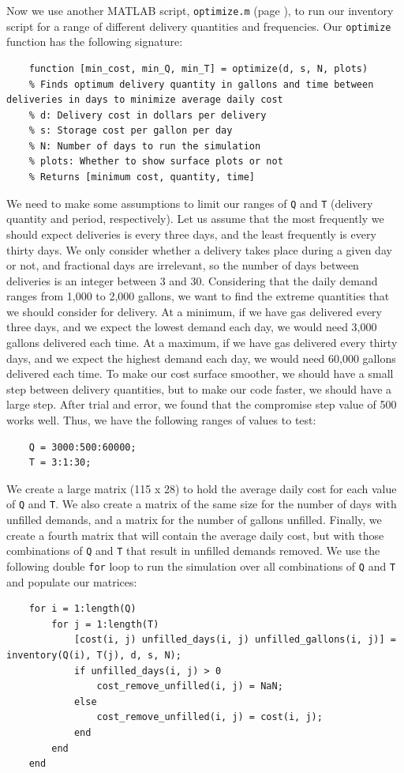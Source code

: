 \documentclass{article}
\begin{document}
    Now we use another MATLAB script, \texttt{optimize.m} (page \pageref{code:optimize}), to run our inventory script for a range of different delivery quantities and frequencies. Our \texttt{optimize} function has the following signature:
    \begin{verbatim}
    function [min_cost, min_Q, min_T] = optimize(d, s, N, plots)
    % Finds optimum delivery quantity in gallons and time between deliveries in days to minimize average daily cost
    % d: Delivery cost in dollars per delivery
    % s: Storage cost per gallon per day
    % N: Number of days to run the simulation
    % plots: Whether to show surface plots or not
    % Returns [minimum cost, quantity, time]
    \end{verbatim}
    We need to make some assumptions to limit our ranges of \texttt{Q} and \texttt{T} (delivery quantity and period, respectively). Let us assume that the most frequently we should expect deliveries is every three days, and the least frequently is every thirty days. We only consider whether a delivery takes place during a given day or not, and fractional days are irrelevant, so the number of days between deliveries is an integer between 3 and 30. Considering that the daily demand ranges from 1,000 to 2,000 gallons, we want to find the extreme quantities that we should consider  for delivery. At a minimum, if we have gas delivered every three days, and we expect the lowest demand each day, we would need 3,000 gallons delivered each time. At a maximum, if we have gas delivered every thirty days, and we expect the highest demand each day, we would need 60,000 gallons delivered each time. To make our cost surface smoother, we should have a small step between delivery quantities, but to make our code faster, we should have a large step. After trial and error, we found that the compromise step value of 500 works well. Thus, we have the following ranges of values to test:
    \begin{verbatim}
    Q = 3000:500:60000;
    T = 3:1:30;
    \end{verbatim}

    \pagebreak
    We create a large matrix (115 x 28) to hold the average daily cost for each value of \texttt{Q} and \texttt{T}. We also create a matrix of the same size for the number of days with unfilled demands, and a matrix for the number of gallons unfilled. Finally, we create a fourth matrix that will contain the average daily cost, but with those combinations of \texttt{Q} and \texttt{T} that result in unfilled demands removed. We use the following double \texttt{for} loop to run the simulation over all combinations of \texttt{Q} and \texttt{T} and populate our matrices:
    \begin{verbatim}
    for i = 1:length(Q)
        for j = 1:length(T)
            [cost(i, j) unfilled_days(i, j) unfilled_gallons(i, j)] = inventory(Q(i), T(j), d, s, N);
            if unfilled_days(i, j) > 0
                cost_remove_unfilled(i, j) = NaN;
            else
                cost_remove_unfilled(i, j) = cost(i, j);
            end
        end
    end
    \end{verbatim}
\end{document}
